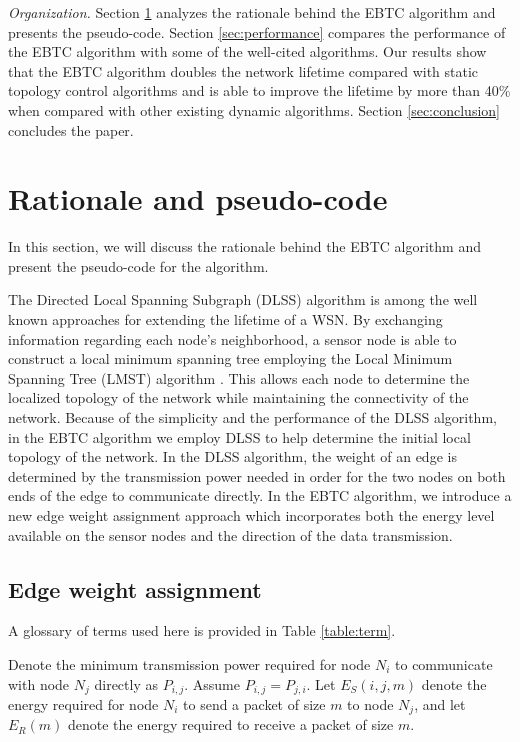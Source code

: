 \documentclass[journal,12pt,onecolumn]{IEEEtran}
\begin{document}
{\em Organization.} Section
\ref{sec:pseudo_code} analyzes the rationale behind the EBTC algorithm
and presents the pseudo-code. Section
\ref{sec:performance} compares the performance of
the EBTC algorithm with some of the well-cited algorithms. Our
results show that the EBTC algorithm doubles the network
lifetime compared with static topology control algorithms and is able to improve the lifetime
by more than 40\% when compared with other existing dynamic algorithms.
Section \ref{sec:conclusion}
concludes the paper.

\section{Rationale and pseudo-code }\label{sec:pseudo_code}
In this section, we will discuss the rationale behind the EBTC
algorithm and present the pseudo-code for the algorithm.

The Directed Local Spanning Subgraph (DLSS) \cite{LiHou2005-1313}
algorithm is among the well known approaches for extending the
lifetime of a WSN. By exchanging information regarding each
node's neighborhood, a sensor node is able to construct a local
minimum spanning tree employing the Local Minimum Spanning Tree
(LMST) algorithm \cite{LiHou2005-1313}. This allows each node to
determine the localized topology of the network while maintaining the connectivity of the network. Because of the simplicity
and the performance of the DLSS algorithm, in the EBTC algorithm we
employ DLSS to help determine the initial local topology of the
network.
In the DLSS algorithm, the weight of an
edge is determined by the transmission power needed in order for the
two nodes on both ends of the edge to communicate directly. In the
EBTC algorithm, we introduce a new edge weight assignment approach
which incorporates both the energy level available on the sensor nodes
and the direction of the data transmission.



\subsection{Edge weight assignment}

A glossary of terms used here is provided in Table \ref{table:term}.

Denote the minimum transmission power required for node $N_i$ to
communicate with node $N_j$ directly as $P_{i,j}$. Assume
$P_{i,j}=P_{j,i}$. Let $E_S(i,j,m)$ denote the energy required for
node $N_i$ to send a packet of size $m$ to node $N_j$, and let
$E_R(m)$ denote the energy required to receive a packet of size $m$.
\end{document}
